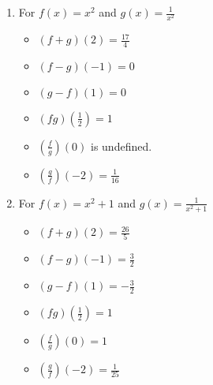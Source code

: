 \begin{enumerate}
\item For  $f(x) = x^2$ and $g(x) = \frac{1}{x^2}$

\begin{multicols}{3}
\begin{itemize}

\item  $(f+g)(2) =\frac{17}{4}$
\item  $(f-g)(-1) = 0$
\item  $(g-f)(1) = 0$

\end{itemize}
\end{multicols}

\begin{multicols}{3}
\begin{itemize}

\item  $(fg)\left(\frac{1}{2}\right) =1$
\item  $\left(\frac{f}{g}\right)(0)$ is undefined.
\item  $\left(\frac{g}{f}\right)\left(-2\right) = \frac{1}{16}$

\end{itemize}
\end{multicols}

\item For  $f(x) = x^2+1$ and $g(x) = \frac{1}{x^2+1}$

\begin{multicols}{3}
\begin{itemize}

\item  $(f+g)(2) =\frac{26}{5}$
\item  $(f-g)(-1) = \frac{3}{2}$
\item  $(g-f)(1) = -\frac{3}{2}$

\end{itemize}
\end{multicols}

\begin{multicols}{3}
\begin{itemize}

\item  $(fg)\left(\frac{1}{2}\right) =1$
\item  $\left(\frac{f}{g}\right)(0) = 1$
\item  $\left(\frac{g}{f}\right)\left(-2\right) = \frac{1}{25}$

\end{itemize}
\end{multicols}

\setcounter{HW}{\value{enumi}}
\end{enumerate}

